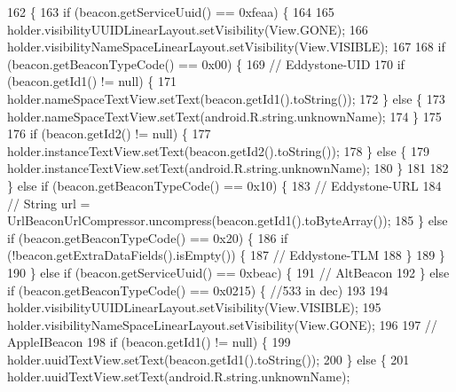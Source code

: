 \begin{DoxyCode}
162                                                                        \{
163         \textcolor{keywordflow}{if} (beacon.getServiceUuid() == 0xfeaa) \{
164 
165             holder.visibilityUUIDLinearLayout.setVisibility(View.GONE);
166             holder.visibilityNameSpaceLinearLayout.setVisibility(View.VISIBLE);
167 
168             \textcolor{keywordflow}{if} (beacon.getBeaconTypeCode() == 0x00) \{
169                 \textcolor{comment}{// Eddystone-UID}
170                 \textcolor{keywordflow}{if} (beacon.getId1() != null) \{
171                     holder.nameSpaceTextView.setText(beacon.getId1().toString());
172                 \} \textcolor{keywordflow}{else} \{
173                     holder.nameSpaceTextView.setText(android.R.string.unknownName);
174                 \}
175 
176                 \textcolor{keywordflow}{if} (beacon.getId2() != null) \{
177                     holder.instanceTextView.setText(beacon.getId2().toString());
178                 \} \textcolor{keywordflow}{else} \{
179                     holder.instanceTextView.setText(android.R.string.unknownName);
180                 \}
181 
182             \} \textcolor{keywordflow}{else} \textcolor{keywordflow}{if} (beacon.getBeaconTypeCode() == 0x10) \{
183                 \textcolor{comment}{// Eddystone-URL}
184                 \textcolor{comment}{// String url = UrlBeaconUrlCompressor.uncompress(beacon.getId1().toByteArray());}
185             \} \textcolor{keywordflow}{else} \textcolor{keywordflow}{if} (beacon.getBeaconTypeCode() == 0x20) \{
186                 \textcolor{keywordflow}{if} (!beacon.getExtraDataFields().isEmpty()) \{
187                     \textcolor{comment}{// Eddystone-TLM}
188                 \}
189             \}
190         \} \textcolor{keywordflow}{else} \textcolor{keywordflow}{if} (beacon.getServiceUuid() == 0xbeac) \{
191             \textcolor{comment}{// AltBeacon}
192         \} \textcolor{keywordflow}{else} \textcolor{keywordflow}{if} (beacon.getBeaconTypeCode() == 0x0215) \{ \textcolor{comment}{//533 in dec)}
193 
194             holder.visibilityUUIDLinearLayout.setVisibility(View.VISIBLE);
195             holder.visibilityNameSpaceLinearLayout.setVisibility(View.GONE);
196 
197             \textcolor{comment}{// AppleIBeacon}
198             \textcolor{keywordflow}{if} (beacon.getId1() != null) \{
199                 holder.uuidTextView.setText(beacon.getId1().toString());
200             \} \textcolor{keywordflow}{else} \{
201                 holder.uuidTextView.setText(android.R.string.unknownName);

\end{DoxyCode}
